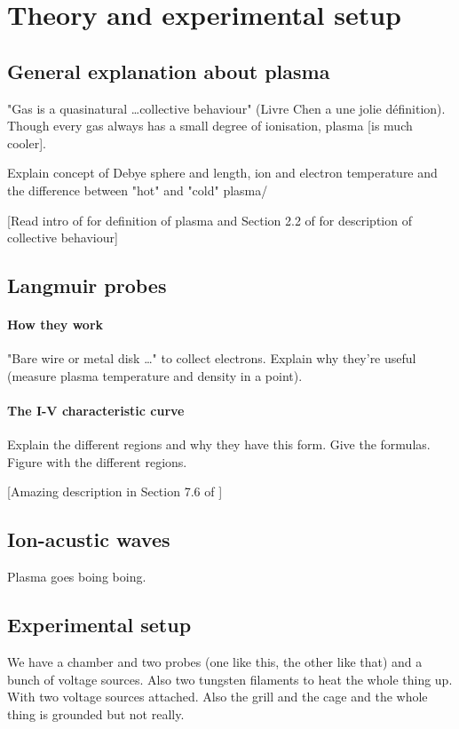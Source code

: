 \section{Theory and experimental setup}

\subsection{General explanation about plasma}
"Gas is a quasinatural \ldots collective behaviour" (Livre Chen a une jolie définition).
Though every gas always has a small degree of ionisation, plasma [is much cooler].

Explain concept of Debye sphere and length, ion and electron temperature and the difference between "hot" and "cold" plasma/

[Read intro of \cite{chen_introduction_1990} for definition of plasma and Section 2.2 of \cite{piel_plasma_2017} for description of collective behaviour]

\subsection{Langmuir probes}
\paragraph{How they work}
"Bare wire or metal disk \ldots" to collect electrons.
Explain why they're useful (measure plasma temperature and density in a point).

\paragraph{The I-V characteristic curve}
Explain the different regions and why they have this form.
Give the formulas.
Figure with the different regions.

[Amazing description in Section 7.6 of \cite{piel_plasma_2017}]

\subsection{Ion-acustic waves}
Plasma goes boing boing.

\subsection{Experimental setup}
We have a chamber and two probes (one like this, the other like that) and a bunch of voltage sources.
Also two tungsten filaments to heat the whole thing up.
With two voltage sources attached.
Also the grill and the cage and the whole thing is grounded but not really.

